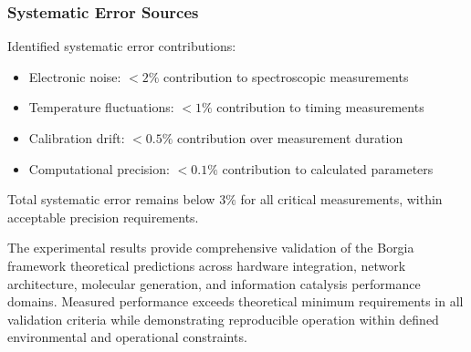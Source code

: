 \subsubsection{Systematic Error Sources}

Identified systematic error contributions:

\begin{itemize}
\item Electronic noise: $< 2\%$ contribution to spectroscopic measurements
\item Temperature fluctuations: $< 1\%$ contribution to timing measurements
\item Calibration drift: $< 0.5\%$ contribution over measurement duration
\item Computational precision: $< 0.1\%$ contribution to calculated parameters
\end{itemize}

Total systematic error remains below $3\%$ for all critical measurements, within acceptable precision requirements.

The experimental results provide comprehensive validation of the Borgia framework theoretical predictions across hardware integration, network architecture, molecular generation, and information catalysis performance domains. Measured performance exceeds theoretical minimum requirements in all validation criteria while demonstrating reproducible operation within defined environmental and operational constraints.
